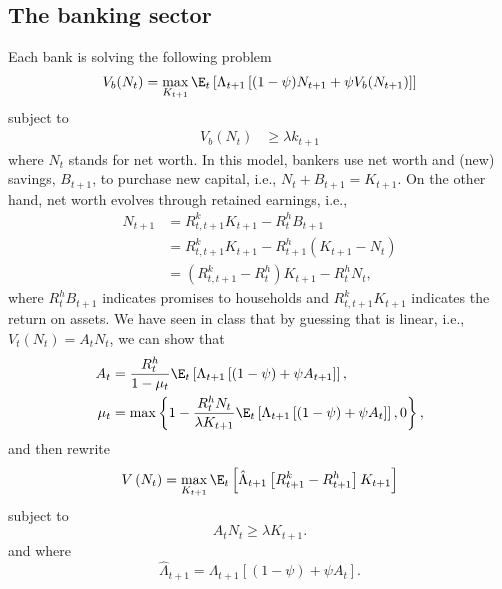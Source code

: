 \documentclass{article}
\begin{document}
	\subsection{The banking sector}
	Each bank is solving the following problem
	\begin{equation}
		V_b(N_t) = \max_{K_{t+1}} \E_t\left[\Lambda_{t+1}\left[(1-\psi)N_{t+1} + \psi V_b(N_{t+1})\right]\right]
	\end{equation}
	subject to
	\begin{align}
		V_b(N_t) &\geq \lambda k_{t+1}\label{FOC:RBC-GK_bank_1_2}
	\end{align}
	where $N_t$ stands for net worth. In this model, bankers use net worth and (new) savings, $B_{t+1}$, to purchase new capital, i.e., $N_t + B_{t+1} = K_{t+1}$. On the other hand, net worth evolves through retained earnings, i.e.,
	\begin{equation}\label{eq:RBC-GK_N_Rk_K_Rh_B}
		\begin{aligned}
			N_{t+1} &= R^k_{t,t+1}K_{t+1} - R^h_{t} B_{t+1} \\
			&= R^k_{t,t+1}K_{t+1} - R^h_{t+1} \left(K_{t+1}-N_t\right)\\
			&= \left(R^k_{t,t+1}-R^h_t\right)K_{t+1} - R^h_{t} N_t,
		\end{aligned}
	\end{equation}
	where $R_t^h B_{t+1}$ indicates promises to households and $R^k_{t,t+1}K_{t+1}$ indicates the return on assets. We have seen in class that by guessing that is linear, i.e., $V_t(N_t) = A_tN_t$, we can show that
	\begin{align}
		A_t &= \frac{R_t^h}{1-\mu_t}\E_t\left[\Lambda_{t+1}\left[(1-\psi)+ \psi A_{t+1}\right]\right],\label{eq:RBC-GK_bank_A}\\
		\mu_t &= \max\left\{1-\frac{R_t^hN_t}{\lambda K_{t+1}}\E_t\left[\Lambda_{t+1}\left[(1-\psi)+\psi A_t\right]\right],0\right\},\label{eq:RBC-GK_bank_mu}
	\end{align}
	and then rewrite
	\begin{equation}
		V\left(N_t\right) = \max_{K_{t+1}} \E_t\left[\hat{\Lambda}_{t+1}\left[R_{t+1}^k-R_{t+1}^h\right]K_{t+1}\right]
	\end{equation}
	subject to
	\begin{equation}
		A_t N_t \geq \lambda K_{t+1}.\label{eq:RBC-GK_A_N_K}
	\end{equation}
	and where
	\begin{equation}
		\hat{\Lambda}_{t+1} = \Lambda_{t+1}\left[(1-\psi) + \psi A_t\right].
	\end{equation}
\end{document}
